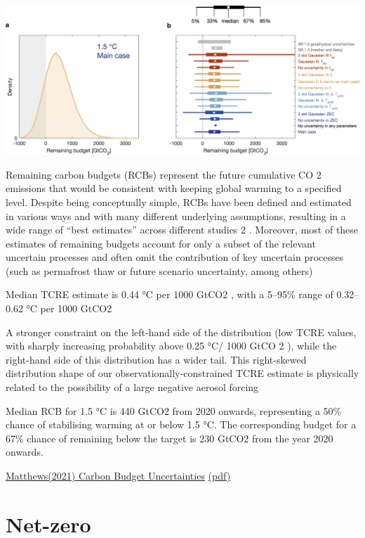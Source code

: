 \documentclass[
]{book}
\begin{document}
\includegraphics{fig/carbon_budget.png}

Remaining carbon budgets (RCBs) represent the future
cumulative CO 2 emissions that would be consistent with
keeping global warming to a specified level.
Despite being conceptually simple, RCBs have been
defined and estimated in various ways and with many different
underlying assumptions, resulting in a wide range of
``best estimates'' across different studies 2 . Moreover, most of these
estimates of remaining budgets account for only a subset of the
relevant uncertain processes and often omit the contribution of
key uncertain processes (such as permafrost thaw or future
scenario uncertainty, among others)

Median TCRE estimate is 0.44 °C per 1000 GtCO2 , with a 5--95\%
range of 0.32--0.62 °C per 1000 GtCO2

A stronger constraint on the left-hand side of the distribution (low
TCRE values, with sharply increasing probability above 0.25 °C/
1000 GtCO 2 ), while the right-hand side of this distribution has a
wider tail. This right-skewed distribution shape of our
observationally-constrained TCRE estimate is physically related
to the possibility of a large negative aerosol forcing

Median RCB for 1.5 °C is 440 GtCO2 from 2020
onwards, representing a 50\% chance of stabilising warming at or
below 1.5 °C.
The corresponding budget for a 67\% chance of remaining below the target is
230 GtCO2 from the year 2020 onwards.

\href{https://www.nature.com/articles/s43247-020-00064-9}{Matthews(2021) Carbon Budget Uncertainties}
\href{pdf/Matthews_2021_Carbon_Budget_Uncertainties.pdf}{(pdf)}

\hypertarget{net-zero}{%
\section{Net-zero}\label{net-zero}}
\end{document}

